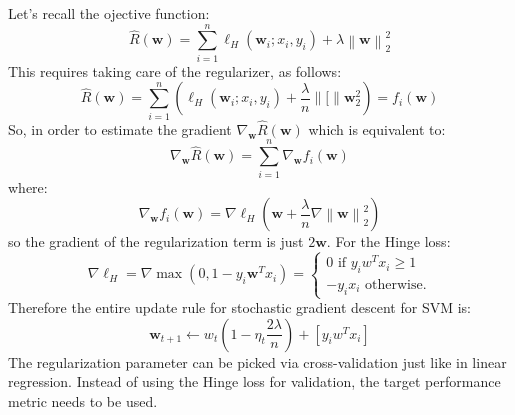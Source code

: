 \documentclass[a4paper,10pt,twoside]{article}
\newcommand\norm[1]{\left\lVert#1\right\rVert}
\begin{document}
Let's recall the ojective function:
\begin{equation*}
    \hat{R}(\mathbf{w})=\sum_{i=1}^{n}\ell_{H}(\mathbf{w}_i; x_i,y_i) + \lambda\norm{\mathbf{w}}_2^2
\end{equation*}
This requires taking care of the regularizer, as follows:
\begin{equation*}
    \hat{R}(\mathbf{w})=\sum_{i=1}^{n}\left(\ell_{H}(\mathbf{w}_i; x_i,y_i) + \frac{\lambda}{n}\norm[{\mathbf{w}}_2^2\right)=f_i(\mathbf{w})
\end{equation*}
So, in order to estimate the gradient $\nabla_{\mathbf{w}}\hat{R}(\mathbf{w})$ which is equivalent to:
\begin{equation*}
    \nabla_{\mathbf{w}}\hat{R}(\mathbf{w})=\sum_{i=1}^{n}\nabla_{\mathbf{w}}f_{i}(\mathbf{w})
\end{equation*}
where:
\begin{equation*}
    \nabla_{\mathbf{w}}f_{i}(\mathbf{w}) = \nabla\ell_{H}(\mathbf{w}+\frac{\lambda}{n}\nabla\norm{\mathbf{w}}_2^2)
\end{equation*}
so the gradient of the regularization term is just $2\mathbf{w}$. For the Hinge loss:
\begin{equation*}
    \nabla\ell_H = \nabla\max(0,1-y_i\mathbf{w}^Tx_i)
    = \begin{cases}
        0\text{ if } y_iw^Tx_i\geq 1\\
        -y_ix_i\text{ otherwise.}
    \end{cases}
\end{equation*}
Therefore the entire update rule for stochastic gradient descent for SVM is:
\begin{equation*}
    \mathbf{w}_{t+1}\leftarrow w_t\left(1-\eta_t\frac{2\lambda}{n}\right)+\left[y_iw^Tx_i\right]
\end{equation*}
The regularization parameter can be picked via cross-validation just like in linear regression. Instead of using the Hinge loss for validation, the target performance metric needs to be used.
\end{document}
